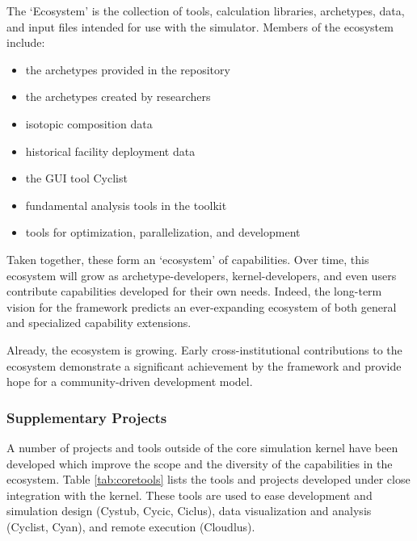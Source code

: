 The \Cyclus `Ecosystem' is the collection of tools, calculation libraries, 
archetypes, data, and input files intended for use with the \Cyclus simulator. 
Members of the ecosystem include:
\begin{itemize}
\item the archetypes provided in the \Cycamore \cite{carlsen_cycamore_2014} 
repository
\item the archetypes created by researchers
\item isotopic composition data
\item historical facility deployment data
\item the \Cyclus \gls{GUI} tool Cyclist
\item fundamental analysis tools in the \Cyclus toolkit
\item tools for \Cyclus optimization, parallelization, and development
\end{itemize}
Taken together, these form an `ecosystem' of capabilities. Over time, this 
ecosystem will grow as archetype-developers, kernel-developers, and 
even users contribute capabilities developed for their own needs. Indeed, the 
long-term vision for the \Cyclus framework predicts an ever-expanding ecosystem 
of both general and specialized capability extensions. 

Already, the ecosystem is growing. Early cross-institutional contributions to 
the ecosystem demonstrate a significant achievement by the \Cyclus framework 
and provide hope for a community-driven development model. 

\subsubsection{Supplementary Projects}

A number of projects and tools outside of the core simulation kernel have been 
developed which improve the scope and the diversity of the capabilities in the \Cyclus 
ecosystem. Table \ref{tab:coretools} lists the tools and projects developed 
under close integration with the \Cyclus kernel.  These tools are used to ease development
and simulation design (Cystub, Cycic, Ciclus), data visualization and analysis (Cyclist, Cyan),
and remote execution (Cloudlus).

